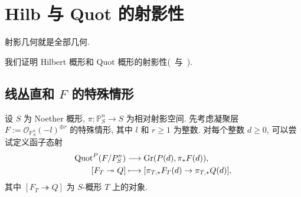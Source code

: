 \section{Hilb 与 Quot 的射影性}\label{src:2.4}
\begin{epigraph}
射影几何就是全部几何.
\end{epigraph}
我们证明 Hilbert 概形和 Quot 概形的射影性(~与~).
\subsection{线丛直和 \texorpdfstring{$F$}{F} 的特殊情形}\label{src:2.4.1-subsection}
设 $S$ 为 Noether 概形, $\pi:\mathbb P_S^n\to S$ 为相对射影空间.
先考虑凝聚层 $F:=\mathcal O_{\mathbb P_S^n}(-l)^{\oplus r}$ 的特殊情形, 其中 $l$ 和 $r\geq1$ 为整数.
对每个整数 $d\geq0$, 可以尝试定义函子态射
\[
\begin{aligned}
\operatorname{Quot}^P(F/P_S^n)&\longrightarrow\operatorname{Gr}(P(d),\pi_*F(d)),\\
[F_T\twoheadrightarrow Q]&\longmapsto
[\pi_{T,*}F_T(d)\to\pi_{T,*}Q(d)],
\end{aligned}
\]
其中 $[F_T\twoheadrightarrow Q]$ 为 $S$-概形 $T$ 上的对象.
